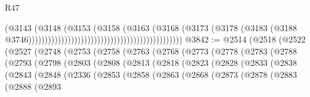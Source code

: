 \begin{lexlean}{R47}
\begin{coremodule}
                                                                              (@3143
                                                                                (@3148
                                                                                  (@3153
                                                                                    (@3158
                                                                                      (@3163
                                                                                        (@3168
                                                                                          (@3173
                                                                                            (@3178
                                                                                              (@3183
                                                                                                (@3188
                                                                                                  @3746)))))))))))))))))))))))))))))))))))))))))))))))
@3842 := @2514
    (@2518
      (@2522
        (@2527
          (@2748
            (@2753
              (@2758
                (@2763
                  (@2768
                    (@2773
                      (@2778
                        (@2783
                          (@2788
                            (@2793
                              (@2798
                                (@2803
                                  (@2808
                                    (@2813
                                      (@2818
                                        (@2823
                                          (@2828
                                            (@2833
                                              (@2838
                                                (@2843
                                                  (@2848
                                                    (@2336
                                                      (@2853
                                                        (@2858
                                                          (@2863
                                                            (@2868
                                                              (@2873
                                                                (@2878
                                                                  (@2883
                                                                    (@2888
                                                                      (@2893

\end{coremodule}
\end{lexlean}
